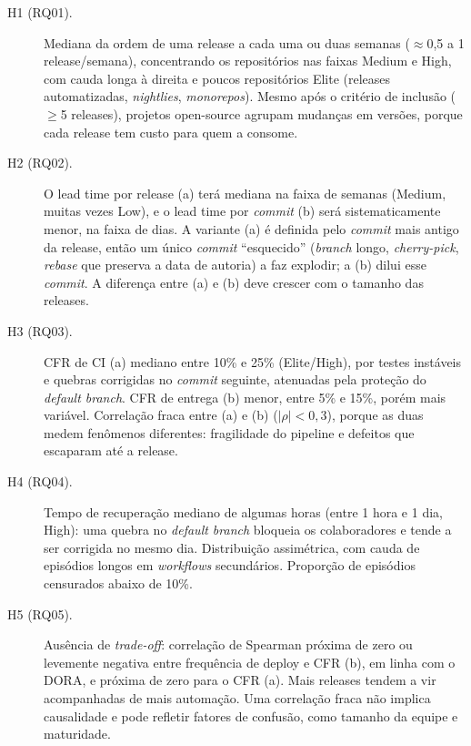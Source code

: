 \begin{description}
  \item[H1 (RQ01).] Mediana da ordem de uma release a cada uma ou duas semanas
  ($\approx$0,5 a 1 release/semana), concentrando os repositórios nas faixas
  Medium e High, com cauda longa à direita e poucos repositórios Elite (releases
  automatizadas, \textit{nightlies}, \textit{monorepos}). Mesmo após o critério
  de inclusão ($\geq$5 releases), projetos open-source agrupam mudanças em
  versões, porque cada release tem custo para quem a consome.

  \item[H2 (RQ02).] O lead time por release (a) terá mediana na faixa de semanas
  (Medium, muitas vezes Low), e o lead time por \textit{commit} (b) será
  sistematicamente menor, na faixa de dias. A variante (a) é definida pelo
  \textit{commit} mais antigo da release, então um único \textit{commit}
  ``esquecido'' (\textit{branch} longo, \textit{cherry-pick}, \textit{rebase} que
  preserva a data de autoria) a faz explodir; a (b) dilui esse \textit{commit}.
  A diferença entre (a) e (b) deve crescer com o tamanho das releases.

  \item[H3 (RQ03).] CFR de CI (a) mediano entre 10\% e 25\% (Elite/High), por
  testes instáveis e quebras corrigidas no \textit{commit} seguinte, atenuadas
  pela proteção do \textit{default branch}. CFR de entrega (b) menor, entre 5\% e
  15\%, porém mais variável. Correlação fraca entre (a) e (b) ($|\rho|<0{,}3$),
  porque as duas medem fenômenos diferentes: fragilidade do pipeline e defeitos
  que escaparam até a release.

  \item[H4 (RQ04).] Tempo de recuperação mediano de algumas horas (entre 1 hora e
  1 dia, High): uma quebra no \textit{default branch} bloqueia os colaboradores e
  tende a ser corrigida no mesmo dia. Distribuição assimétrica, com cauda de
  episódios longos em \textit{workflows} secundários. Proporção de episódios
  censurados abaixo de 10\%.

  \item[H5 (RQ05).] Ausência de \textit{trade-off}: correlação de Spearman
  próxima de zero ou levemente negativa entre frequência de deploy e CFR (b), em
  linha com o DORA, e próxima de zero para o CFR (a). Mais releases tendem a vir
  acompanhadas de mais automação. Uma correlação fraca não implica causalidade e
  pode refletir fatores de confusão, como tamanho da equipe e maturidade.


\end{description}
